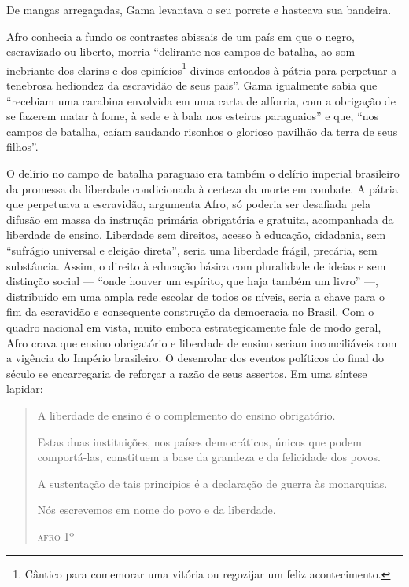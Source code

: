 De mangas arregaçadas, Gama levantava o seu porrete e hasteava sua
bandeira.

Afro conhecia a fundo os contrastes abissais de um país em que o
negro, escravizado ou liberto, morria ``delirante nos campos de batalha,
ao som inebriante dos clarins e dos epinícios\footnote{Cântico
  para comemorar uma vitória ou regozijar um feliz acontecimento.}
divinos entoados à pátria para perpetuar a tenebrosa hediondez da
escravidão de seus pais''. Gama igualmente sabia que ``recebiam uma
carabina envolvida em uma carta de alforria, com a obrigação de se
fazerem matar à fome, à sede e à bala nos esteiros paraguaios'' e que,
``nos campos de batalha, caíam saudando risonhos o glorioso pavilhão da
terra de seus filhos''.

O delírio no campo de batalha paraguaio era também o delírio imperial
brasileiro da promessa da liberdade condicionada à certeza da morte em
combate. A pátria que perpetuava a escravidão, argumenta Afro, só
poderia ser desafiada pela difusão em massa da instrução primária
obrigatória e gratuita, acompanhada da liberdade de ensino. Liberdade
sem direitos, acesso à educação, cidadania, sem ``sufrágio universal e
eleição direta'', seria uma liberdade frágil, precária, sem substância.
Assim, o direito à educação básica com pluralidade de ideias e sem
distinção social --- ``onde houver um espírito, que haja também um livro''
---, distribuído em uma ampla rede escolar de todos os níveis, seria a
chave para o fim da escravidão e consequente construção da democracia no
Brasil. Com o quadro nacional em vista, muito embora estrategicamente
fale de modo geral, Afro crava que ensino obrigatório e liberdade
de ensino seriam inconciliáveis com a vigência do Império brasileiro.
O desenrolar dos eventos políticos do final do século se
encarregaria de reforçar a razão de seus assertos. Em uma síntese
lapidar:

\begin{quote}
A liberdade de ensino é o complemento do ensino obrigatório.

Estas duas instituições, nos países democráticos, únicos que podem
comportá-las, constituem a base da grandeza e da felicidade dos povos.

A sustentação de tais princípios é a declaração de guerra às monarquias.

Nós escrevemos em nome do povo e da liberdade.

\begin{flushright}
\textsc{afro} 1º
\end{flushright}
\end{quote}

